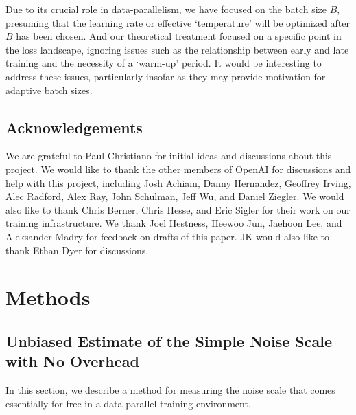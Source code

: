 \documentclass[english]{article}
\begin{document}
Due to its crucial role in data-parallelism, we have focused on the batch size $B$, presuming that the learning rate or effective `temperature' will be optimized after $B$ has been chosen. And our theoretical treatment focused on a specific point in the loss landscape, ignoring issues such as the relationship between early and late training and the necessity of a `warm-up' period. It would be interesting to address these issues, particularly insofar as they may provide  motivation for adaptive batch sizes.

\subsection*{Acknowledgements}
We are grateful to Paul Christiano for initial ideas and discussions about this project. We would like to thank the other members of OpenAI for discussions and help with this project, including Josh Achiam, Danny Hernandez, Geoffrey Irving,  Alec Radford, Alex Ray, John Schulman, Jeff Wu, and Daniel Ziegler.  We would also like to thank Chris Berner, Chris Hesse, and Eric Sigler for their work on our training infrastructure.  We thank Joel Hestness, Heewoo Jun, Jaehoon Lee, and Aleksander Madry for feedback on drafts of this paper.  JK would also like to thank Ethan Dyer for discussions.

\clearpage

\appendix

\section{Methods}
\label{app:Methods}

\subsection{Unbiased Estimate of the Simple Noise Scale with No Overhead}

\label{subsec:noise-scale-measurement}
In this section, we describe a method for measuring the noise scale that comes essentially for free in a data-parallel training environment.
\end{document}
